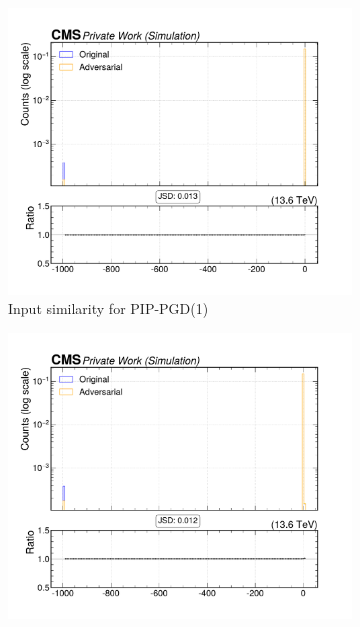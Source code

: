 \begin{figure}[htbp]
  \centering
  \begin{subfigure}[t]{0.32\textwidth}
    \includegraphics[width=\linewidth]{media/output/features/compare/combined_it_1/cmp_global_features_TagVarCSV_trackSumJetEtRatio.pdf}
    \caption*{Input similarity for PIP-PGD(1)}
  \end{subfigure}\hfill
  \begin{subfigure}[t]{0.32\textwidth}
    \includegraphics[width=\linewidth]{media/output/features/compare/combined_it_2/cmp_global_features_TagVarCSV_trackSumJetEtRatio.pdf}

\end{subfigure}
\end{figure}
